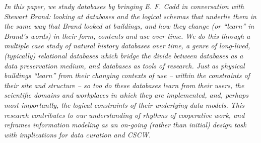 \textit{In this paper, we study databases by bringing E. F. Codd in conversation with Stewart Brand: looking at databases and the logical schemas that underlie them in the same way that Brand looked at buildings, and how they change (or “learn” in Brand’s words) in their form, contents and use over time.  We do this through a multiple case study of natural history databases over time, a genre of long-lived, (typically) relational databases which bridge the divide between databases as a data preservation medium, and databases as tools of research.  Just as physical buildings “learn” from their changing contexts of use – within the constraints of their site and structure – so too do these databases learn from their users, the scientific domains and workplaces in which they are implemented, and, perhaps most importantly, the logical constraints of their underlying data models.  This research contributes to our understanding of rhythms of cooperative work, and reframes information modeling as an on-going (rather than initial) design task with implications for data curation and CSCW.}